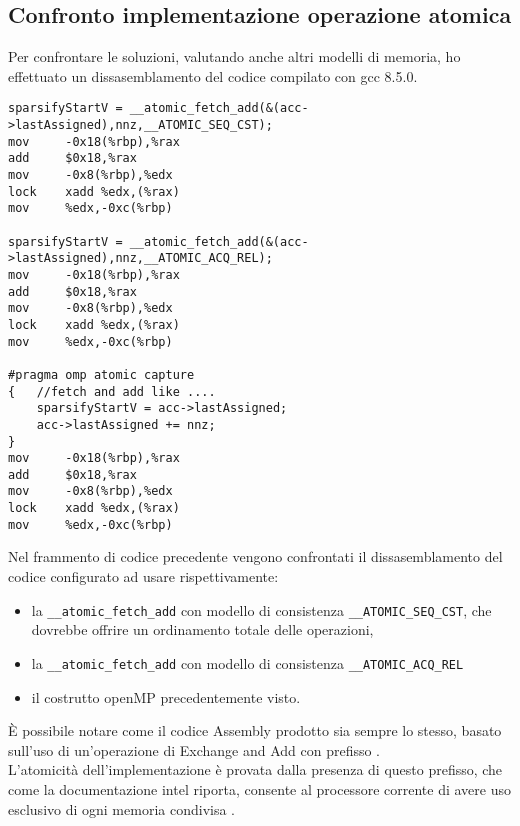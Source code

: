 \subsection{Confronto implementazione operazione atomica}
Per confrontare le soluzioni, valutando anche altri modelli di memoria,
ho effettuato un dissasemblamento del codice compilato con gcc 8.5.0.\\
\begin{lstlisting}[language={[x86masm]Assembler}]
sparsifyStartV = __atomic_fetch_add(&(acc->lastAssigned),nnz,__ATOMIC_SEQ_CST); 
mov		-0x18(%rbp),%rax
add		$0x18,%rax
mov		-0x8(%rbp),%edx
lock 	xadd %edx,(%rax)
mov		%edx,-0xc(%rbp)

sparsifyStartV = __atomic_fetch_add(&(acc->lastAssigned),nnz,__ATOMIC_ACQ_REL); 
mov		-0x18(%rbp),%rax
add		$0x18,%rax
mov		-0x8(%rbp),%edx
lock	xadd %edx,(%rax)
mov		%edx,-0xc(%rbp)

#pragma omp atomic capture
{   //fetch and add like .... 
	sparsifyStartV = acc->lastAssigned;
	acc->lastAssigned += nnz;
}
mov		-0x18(%rbp),%rax
add		$0x18,%rax
mov		-0x8(%rbp),%edx
lock	xadd %edx,(%rax)
mov		%edx,-0xc(%rbp) 
\end{lstlisting}
Nel frammento di codice precedente vengono confrontati il dissasemblamento del codice
configurato ad usare rispettivamente: 
\begin{itemize}
	\item la \verb|__atomic_fetch_add| con modello di consistenza \verb|__ATOMIC_SEQ_CST|, 
	  che dovrebbe offrire un ordinamento totale delle operazioni,
	\item la \verb|__atomic_fetch_add| con modello di consistenza \verb|__ATOMIC_ACQ_REL|
	\item il costrutto openMP  precedentemente visto.\\
\end{itemize}
È possibile notare come il codice Assembly prodotto sia sempre lo stesso,
basato sull'uso di un'operazione di Exchange and Add con prefisso .\\
L'atomicità dell'implementazione è provata dalla presenza di questo prefisso,
che come la documentazione intel riporta, 
consente al processore corrente di avere uso esclusivo di ogni memoria condivisa \cite{intelDevMan2}.\\


